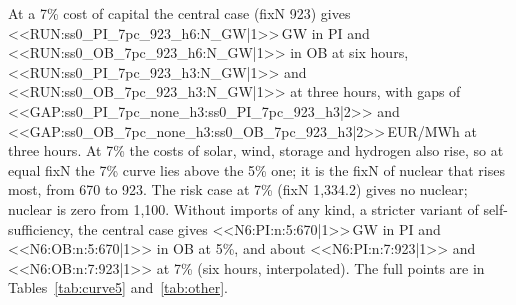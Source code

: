 \begin{table}[htbp]
\centering
\caption{The price of import dependence: system cost at six hours, four years, PI and OB, with nuclear at fixN 670 and without nuclear, by import rule. $X$ is the allowed annual net import as a share of demand. Net imports are imports minus exports in the case with nuclear. Cost in EUR/MWh.}\label{tab:dep}

\end{table}

At a 7\% cost of capital the central case (fixN 923) gives <<RUN:ss0_PI_7pc_923_h6:N_GW|1>>\,GW in PI and <<RUN:ss0_OB_7pc_923_h6:N_GW|1>> in OB at six hours, <<RUN:ss0_PI_7pc_923_h3:N_GW|1>> and <<RUN:ss0_OB_7pc_923_h3:N_GW|1>> at three hours, with gaps of <<GAP:ss0_PI_7pc_none_h3:ss0_PI_7pc_923_h3|2>> and <<GAP:ss0_OB_7pc_none_h3:ss0_OB_7pc_923_h3|2>>\,EUR/MWh at three hours. At 7\% the costs of solar, wind, storage and hydrogen also rise, so at equal fixN the 7\% curve lies above the 5\% one; it is the fixN of nuclear that rises most, from 670 to 923. The risk case at 7\% (fixN 1{,}334.2) gives no nuclear; nuclear is zero from 1{,}100. Without imports of any kind, a stricter variant of self-sufficiency, the central case gives <<N6:PI:n:5:670|1>>\,GW in PI and <<N6:OB:n:5:670|1>> in OB at 5\%, and about <<N6:PI:n:7:923|1>> and <<N6:OB:n:7:923|1>> at 7\% (six hours, interpolated). The full points are in Tables~\ref{tab:curve5} and~\ref{tab:other}.

